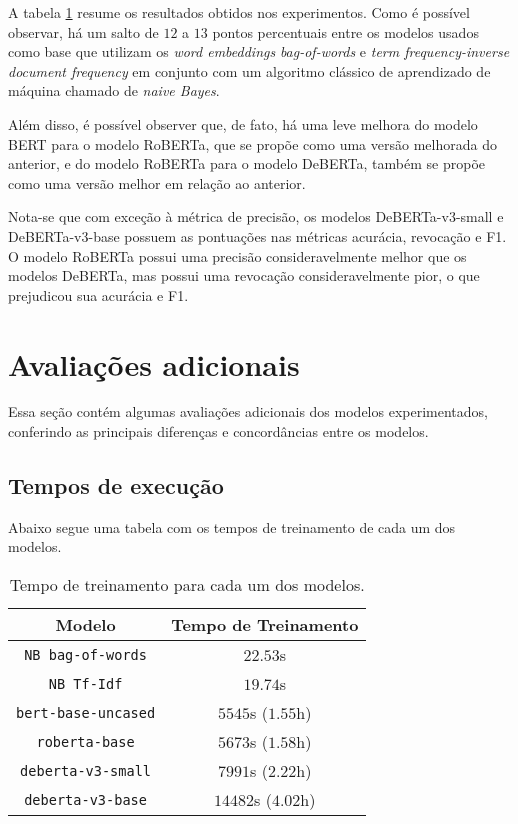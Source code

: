 A tabela \ref{tab:experiments} resume os resultados obtidos nos experimentos.
Como é possível observar, há um salto de $12$ a $13$ pontos percentuais entre os
modelos usados como base que utilizam os \textit{word embeddings}
\textit{bag-of-words} e \textit{term frequency-inverse document frequency} em
conjunto com um algoritmo clássico de aprendizado de máquina chamado de
\textit{naive Bayes}.

Além disso, é possível observer que, de fato, há uma leve melhora do modelo BERT
para o modelo RoBERTa, que se propõe como uma versão melhorada do anterior, e do
modelo RoBERTa para o modelo DeBERTa, também se propõe como uma versão melhor em
relação ao anterior.

Nota-se que com exceção à métrica de precisão, os modelos DeBERTa-v3-small e
DeBERTa-v3-base possuem as pontuações nas métricas acurácia, revocação e F1. O
modelo RoBERTa possui uma precisão consideravelmente melhor que os modelos
DeBERTa, mas possui uma revocação consideravelmente pior, o que prejudicou sua
acurácia e F1.


\section{Avaliações adicionais}%
\label{sec:avaliacoes_adicionais}

Essa seção contém algumas avaliações adicionais dos modelos experimentados,
conferindo as principais diferenças e concordâncias entre os modelos.

\subsection{Tempos de execução}%
\label{sub:tempos_de_execucao}

Abaixo segue uma tabela com os tempos de treinamento de cada um dos modelos.

\begin{table}[h]
\centering
\caption{Tempo de treinamento para cada um dos modelos.}
\label{tab:experiments}
\begin{tabular}{c | c }
   \textbf{Modelo} & \textbf{Tempo de Treinamento} \\ \hline \hline
   \texttt{NB bag-of-words} & $22.53$s \\
   \texttt{NB Tf-Idf} & $19.74$s \\ \hline
   \texttt{bert-base-uncased} & $5545$s ($1.55$h) \\
   \texttt{roberta-base} & $5673$s ($1.58$h) \\
   \texttt{deberta-v3-small} & $7991$s ($2.22$h) \\
   \texttt{deberta-v3-base} & $14482$s ($4.02$h) \\ \hline
\end{tabular}
\end{table}

